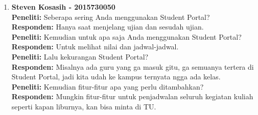 \begin{enumerate}
	\item\textbf{Steven Kosasih - 2015730050}\\
	\textbf{Peneliti:} Seberapa sering Anda menggunakan Student Portal?\\
	\textbf{Responden:} Hanya saat menjelang ujian dan sesudah ujian.\\
	\textbf{Peneliti:} Kemudian untuk apa saja Anda menggunakan Student Portal?\\
	\textbf{Responden:} Untuk melihat nilai dan jadwal-jadwal.\\
	\textbf{Peneliti:} Lalu kekurangan Student Portal?\\
	\textbf{Responden:} Misalnya ada guru yang ga masuk gitu, ga semuanya tertera di Student Portal, jadi kita udah ke kampus ternyata ngga ada kelas.\\
	\textbf{Peneliti:} Kemudian fitur-fitur apa yang perlu ditambahkan?\\
	\textbf{Responden:} Mungkin fitur-fitur untuk penjadwalan seluruh kegiatan kuliah seperti kapan liburnya, kan bisa minta di TU.\\
\end{enumerate}